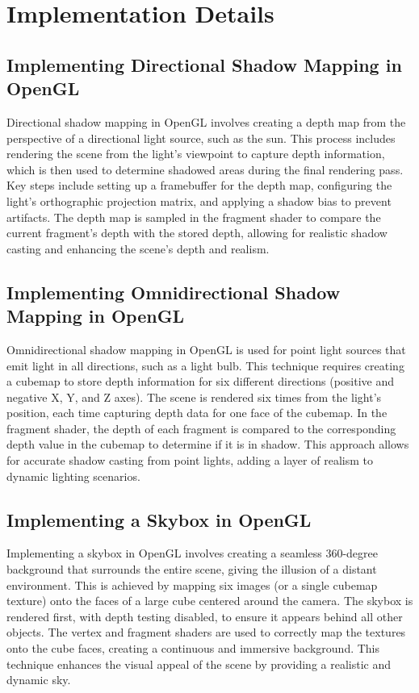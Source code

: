 \documentclass[12pt]{article}
\begin{document}
	\section{Implementation Details}
	
	\subsection{Implementing Directional Shadow Mapping in OpenGL}
	Directional shadow mapping in OpenGL involves creating a depth map from the perspective of a directional light source, such as the sun. This process includes rendering the scene from the light's viewpoint to capture depth information, which is then used to determine shadowed areas during the final rendering pass. Key steps include setting up a framebuffer for the depth map, configuring the light's orthographic projection matrix, and applying a shadow bias to prevent artifacts. The depth map is sampled in the fragment shader to compare the current fragment's depth with the stored depth, allowing for realistic shadow casting and enhancing the scene's depth and realism.

	\subsection{Implementing Omnidirectional Shadow Mapping in OpenGL}
	Omnidirectional shadow mapping in OpenGL is used for point light sources that emit light in all directions, such as a light bulb. This technique requires creating a cubemap to store depth information for six different directions (positive and negative X, Y, and Z axes). The scene is rendered six times from the light's position, each time capturing depth data for one face of the cubemap. In the fragment shader, the depth of each fragment is compared to the corresponding depth value in the cubemap to determine if it is in shadow. This approach allows for accurate shadow casting from point lights, adding a layer of realism to dynamic lighting scenarios.

	\subsection{Implementing a Skybox in OpenGL}
	Implementing a skybox in OpenGL involves creating a seamless 360-degree background that surrounds the entire scene, giving the illusion of a distant environment. This is achieved by mapping six images (or a single cubemap texture) onto the faces of a large cube centered around the camera. The skybox is rendered first, with depth testing disabled, to ensure it appears behind all other objects. The vertex and fragment shaders are used to correctly map the textures onto the cube faces, creating a continuous and immersive background. This technique enhances the visual appeal of the scene by providing a realistic and dynamic sky.
\end{document}
